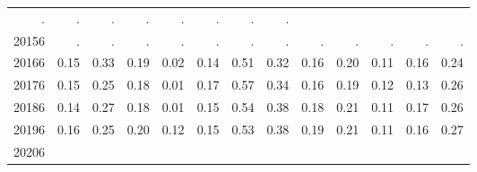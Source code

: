 \begin{table}[!h]
\begin{tabular}{lllllllllllll}
  \multicolumn{1}{r}{.} &
  \multicolumn{1}{r}{.} &
  \multicolumn{1}{r}{.} &
  \multicolumn{1}{r}{.} &
  \multicolumn{1}{r}{.} &
  \multicolumn{1}{r}{.} &
  \multicolumn{1}{r}{.} &
  \multicolumn{1}{r}{.} \\
\multicolumn{1}{l}{\hspace{1em}20156} &
  \multicolumn{1}{|r}{.} &
  \multicolumn{1}{r}{.} &
  \multicolumn{1}{r}{.} &
  \multicolumn{1}{r}{.} &
  \multicolumn{1}{r}{.} &
  \multicolumn{1}{r}{.} &
  \multicolumn{1}{r}{.} &
  \multicolumn{1}{r}{.} &
  \multicolumn{1}{r}{.} &
  \multicolumn{1}{r}{.} &
  \multicolumn{1}{r}{.} &
  \multicolumn{1}{r}{.} \\
\multicolumn{1}{l}{\hspace{1em}20166} &
  \multicolumn{1}{|r}{0.15} &
  \multicolumn{1}{r}{0.33} &
  \multicolumn{1}{r}{0.19} &
  \multicolumn{1}{r}{0.02} &
  \multicolumn{1}{r}{0.14} &
  \multicolumn{1}{r}{0.51} &
  \multicolumn{1}{r}{0.32} &
  \multicolumn{1}{r}{0.16} &
  \multicolumn{1}{r}{0.20} &
  \multicolumn{1}{r}{0.11} &
  \multicolumn{1}{r}{0.16} &
  \multicolumn{1}{r}{0.24} \\
\multicolumn{1}{l}{\hspace{1em}20176} &
  \multicolumn{1}{|r}{0.15} &
  \multicolumn{1}{r}{0.25} &
  \multicolumn{1}{r}{0.18} &
  \multicolumn{1}{r}{0.01} &
  \multicolumn{1}{r}{0.17} &
  \multicolumn{1}{r}{0.57} &
  \multicolumn{1}{r}{0.34} &
  \multicolumn{1}{r}{0.16} &
  \multicolumn{1}{r}{0.19} &
  \multicolumn{1}{r}{0.12} &
  \multicolumn{1}{r}{0.13} &
  \multicolumn{1}{r}{0.26} \\
\multicolumn{1}{l}{\hspace{1em}20186} &
  \multicolumn{1}{|r}{0.14} &
  \multicolumn{1}{r}{0.27} &
  \multicolumn{1}{r}{0.18} &
  \multicolumn{1}{r}{0.01} &
  \multicolumn{1}{r}{0.15} &
  \multicolumn{1}{r}{0.54} &
  \multicolumn{1}{r}{0.38} &
  \multicolumn{1}{r}{0.18} &
  \multicolumn{1}{r}{0.21} &
  \multicolumn{1}{r}{0.11} &
  \multicolumn{1}{r}{0.17} &
  \multicolumn{1}{r}{0.26} \\
\multicolumn{1}{l}{\hspace{1em}20196} &
  \multicolumn{1}{|r}{0.16} &
  \multicolumn{1}{r}{0.25} &
  \multicolumn{1}{r}{0.20} &
  \multicolumn{1}{r}{0.12} &
  \multicolumn{1}{r}{0.15} &
  \multicolumn{1}{r}{0.53} &
  \multicolumn{1}{r}{0.38} &
  \multicolumn{1}{r}{0.19} &
  \multicolumn{1}{r}{0.21} &
  \multicolumn{1}{r}{0.11} &
  \multicolumn{1}{r}{0.16} &
  \multicolumn{1}{r}{0.27} \\
\multicolumn{1}{l}{\hspace{1em}20206} &

\end{tabular}
\end{table}
